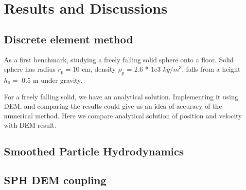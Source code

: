 \chapter{Results and Discussions}


\section{Discrete element method}

As a first benchmark, studying a freely falling solid sphere onto a
floor. Solid sphere has radius $r_p = 10$ cm, density $\rho_p$ = 2.6 *
1e3 $kg/m^3$, falls from a height $h_0 =$ 0.5 m under gravity.


For a freely falling solid, we have an analytical solution. Implementing
it using DEM, and comparing the results could give us an idea of accuracy of
the numerical method. Here we compare analytical solution of  position and velocity
with DEM result.



\section{Smoothed Particle Hydrodynamics}


\section{SPH DEM coupling}

